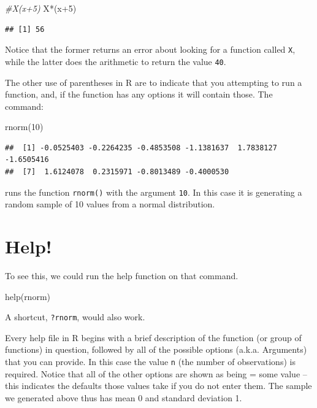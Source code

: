 \documentclass[
]{book}
\newenvironment{Shaded}{\begin{snugshade}}{\end{snugshade}}
\newcommand{\CommentTok}[1]{\textcolor[rgb]{0.56,0.35,0.01}{\textit{#1}}}
\newcommand{\DecValTok}[1]{\textcolor[rgb]{0.00,0.00,0.81}{#1}}
\newcommand{\FunctionTok}[1]{\textcolor[rgb]{0.00,0.00,0.00}{#1}}
\newcommand{\NormalTok}[1]{#1}
\newcommand{\SpecialCharTok}[1]{\textcolor[rgb]{0.00,0.00,0.00}{#1}}
\begin{document}
\begin{Shaded}
\begin{Highlighting}[]
\CommentTok{\#X(x+5)}
\NormalTok{X}\SpecialCharTok{*}\NormalTok{(x}\SpecialCharTok{+}\DecValTok{5}\NormalTok{)}
\end{Highlighting}
\end{Shaded}

\begin{verbatim}
## [1] 56
\end{verbatim}

Notice that the former returns an error about looking for a function called \texttt{X}, while the latter does the arithmetic to return the value \texttt{40}.

The other use of parentheses in R are to indicate that you attempting to run a function, and, if the function has any options it will contain those. The command:

\begin{Shaded}
\begin{Highlighting}[]
\FunctionTok{rnorm}\NormalTok{(}\DecValTok{10}\NormalTok{)}
\end{Highlighting}
\end{Shaded}

\begin{verbatim}
##  [1] -0.0525403 -0.2264235 -0.4853508 -1.1381637  1.7838127 -1.6505416
##  [7]  1.6124078  0.2315971 -0.8013489 -0.4000530
\end{verbatim}

runs the function \texttt{rnorm()} with the argument \texttt{10}. In this case it is generating a random sample of 10 values from a normal distribution.

\hypertarget{help}{%
\section{Help!}\label{help}}

To see this, we could run the help function on that command.

\begin{Shaded}
\begin{Highlighting}[]
\FunctionTok{help}\NormalTok{(rnorm)}
\end{Highlighting}
\end{Shaded}

A shortcut, \texttt{?rnorm}, would also work.

Every help file in R begins with a brief description of the function (or group of functions) in question, followed by all of the possible options (a.k.a. Arguments) that you can provide. In this case the value \texttt{n} (the number of observations) is required. Notice that all of the other options are shown as being = some value -- this indicates the defaults those values take if you do not enter them. The sample we generated above thus has mean 0 and standard deviation 1.
\end{document}

